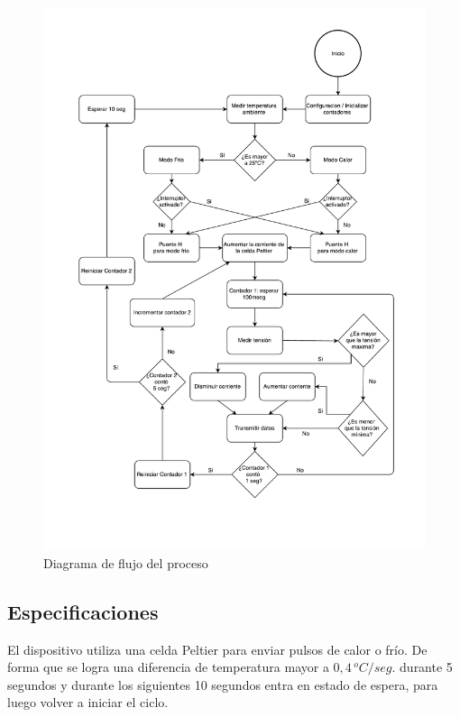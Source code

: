 \documentclass[10pt,spanish,a4paper,openany,notitlepage]{article}
\begin{document}
\begin{figure}[H] %
\begin{center}
\includegraphics[scale=0.55]{./imagenes/diagrama_de_flujo.pdf}
\caption{Diagrama de flujo del proceso}
 \label{fig:diag_flujo}
\end{center}
\end{figure}


\subsection{Especificaciones}

El dispositivo utiliza una celda Peltier para enviar pulsos de calor
o frío. De forma que se logra una diferencia de temperatura mayor a $0,4\, \unit{^oC/seg.}$
durante 5 segundos y durante los siguientes 10 segundos entra
en estado de espera, para luego volver a iniciar el ciclo. 
\end{document}
